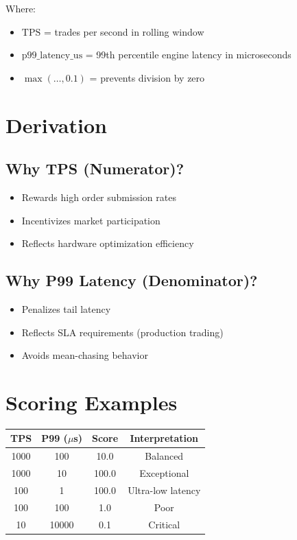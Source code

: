 \documentclass[10pt,a4paper,oneside]{report}
\begin{document}
Where:
\begin{itemize}
    \item $\text{TPS}$ = trades per second in rolling window
    \item $\text{p99\_latency\_us}$ = 99th percentile engine latency in microseconds
    \item $\max(\ldots, 0.1)$ = prevents division by zero
\end{itemize}

\section{Derivation}

\subsection{Why TPS (Numerator)?}

\begin{itemize}
    \item Rewards high order submission rates
    \item Incentivizes market participation
    \item Reflects hardware optimization efficiency
\end{itemize}

\subsection{Why P99 Latency (Denominator)?}

\begin{itemize}
    \item Penalizes tail latency
    \item Reflects SLA requirements (production trading)
    \item Avoids mean-chasing behavior
\end{itemize}

\section{Scoring Examples}

\begin{table}[H]\small
    \centering
    \begin{tabular}{cccc}
    \toprule
    \textbf{TPS} & \textbf{P99 ($\mu$s)} & \textbf{Score} & \textbf{Interpretation} \\
    \midrule
    1000 & 100 & 10.0 & Balanced \\
    1000 & 10 & 100.0 & Exceptional \\
    100 & 1 & 100.0 & Ultra-low latency \\
    100 & 100 & 1.0 & Poor \\
    10 & 10000 & 0.1 & Critical \\
    \bottomrule
    \end{tabular}
\end{table}
\end{document}
